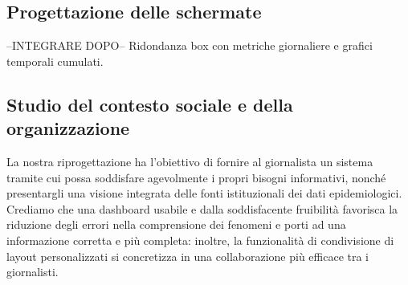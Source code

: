 \subsection{Progettazione delle schermate}
--INTEGRARE DOPO--
Ridondanza box con metriche giornaliere e grafici temporali cumulati.

\subsection{Studio del contesto sociale e della organizzazione}
La nostra riprogettazione ha l'obiettivo di fornire al giornalista un sistema tramite cui possa soddisfare agevolmente i propri bisogni informativi, nonché presentargli una visione integrata delle fonti istituzionali dei dati epidemiologici. Crediamo che una dashboard usabile e dalla soddisfacente fruibilità favorisca la riduzione degli errori nella comprensione dei fenomeni e porti ad una informazione corretta e più completa: inoltre, la funzionalità di condivisione di layout personalizzati si concretizza in una collaborazione più efficace tra i giornalisti.
